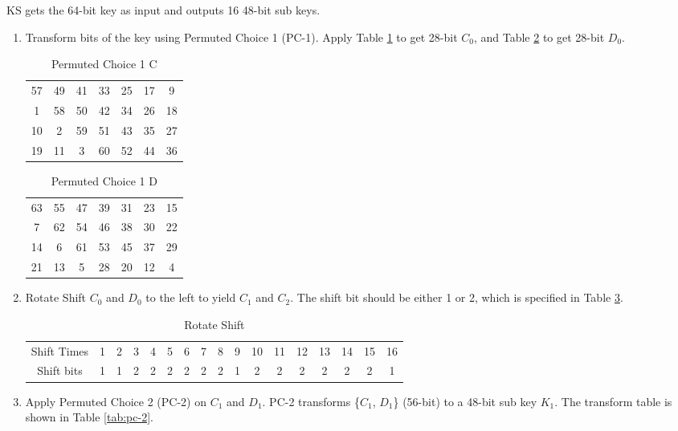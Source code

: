 \documentclass[12pt]{article}
\begin{document}
\begin{enumerate}
\begin{itemize}
				KS gets the 64-bit key as input and outputs 16 48-bit sub keys.
				\begin{enumerate}
					\item
						Transform bits of the key using Permuted Choice 1 (PC-1). Apply Table \ref{tab:pc-1c} to get 28-bit $C_0$, and Table \ref{tab:pc-1d} to get 28-bit $D_0$.
						\begin{table}[hbtp]
							\centering
							\begin{tabular}{ccccccc}
								57 & 49 & 41 & 33 & 25 & 17 &  9\\
								 1 & 58 & 50 & 42 & 34 & 26 & 18\\
								10 &  2 & 59 & 51 & 43 & 35 & 27\\
								19 & 11 &  3 & 60 & 52 & 44 & 36\\
							\end{tabular}
							\caption{Permuted Choice 1 C}
							\label{tab:pc-1c}
						\end{table}
						\begin{table}[hbtp]
							\centering
							\begin{tabular}{ccccccc}
								63 & 55 & 47 & 39 & 31 & 23 & 15\\
								 7 & 62 & 54 & 46 & 38 & 30 & 22\\
								14 &  6 & 61 & 53 & 45 & 37 & 29\\
								21 & 13 &  5 & 28 & 20 & 12 &  4\\
							\end{tabular}
							\caption{Permuted Choice 1 D}
							\label{tab:pc-1d}
						\end{table}
					\item
						\label{step:shift}
						Rotate Shift $C_0$ and $D_0$ to the left to yield $C_1$ and $C_2$. The shift bit should be either 1 or 2, which is specified in Table \ref{tab:shift}.
						\begin{table}[hbtp]
							\centering
							\begin{tabular}{ccccccccccccccccc}
								Shift Times & 1 & 2 & 3 & 4 & 5 & 6 & 7 & 8 & 9 & 10 & 11 & 12 & 13 & 14 & 15 & 16\\
								Shift bits  & 1 & 1 & 2 & 2 & 2 & 2 & 2 & 2 & 1 &  2 &  2 &  2 &  2 &  2 &  2 &  1\\
							\end{tabular}
							\caption{Rotate Shift}
							\label{tab:shift}
						\end{table}
					\item
						\label{step:pc-2}
						Apply Permuted Choice 2 (PC-2) on $C_1$ and $D_1$. PC-2 transforms \{$C_1$, $D_1$\} (56-bit) to a 48-bit sub key $K_1$. The transform table is shown in Table \ref{tab:pc-2}.

\end{enumerate}
\end{itemize}
\end{enumerate}
\end{document}
